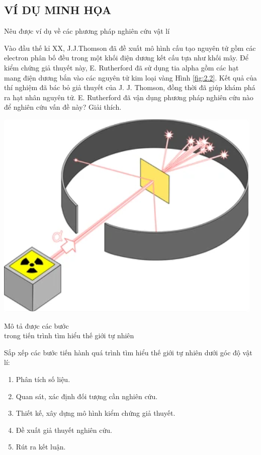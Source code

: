 \subsection{VÍ DỤ MINH HỌA}
\begin{dang}{Nêu được ví dụ về các phương pháp nghiên cứu vật lí}
\end{dang}
\begin{vd}
	Vào đầu thế kỉ XX, J.J.Thomson đã đề xuất mô hình cấu tạo nguyên tử gồm các electron phân bố đều trong một khối điện dương kết cấu tựa như khối mây. Để kiểm chứng giả thuyết này, E. Rutherford đã sử dụng tia alpha gồm các hạt mang điện dương bắn vào các nguyên tử kim loại vàng Hình \ref{fig:2.2}. Kết quả của thí nghiệm đã bác bỏ giả thuyết của J. J. Thomson, đồng thời đã giúp khám phá ra hạt nhân nguyên tử. E. Rutherford đã vận dụng phương pháp nghiên cứu nào để nghiên cứu vấn đề này? Giải thích.
	\begin{center}
		\includegraphics[scale=0.3]{figs/G10Y25B1-4}
		\label{fig:2.2}
	\end{center}
\end{vd}
\begin{dang}{Mô tả được các bước \\trong tiến trình tìm hiểu thế giới tự nhiên}
\end{dang}
\begin{vd}
	Sắp xếp các bước tiến hành quá trình tìm hiểu thế giới tự nhiên dưới góc độ vật lí:
	\begin{enumerate}[label= (\arabic*)]
		\item Phân tích số liệu.
		\item Quan sát, xác định đối tượng cần nghiên cứu.
		\item Thiết kế, xây dựng mô hình kiểm chứng giả thuyết.
		\item Đề xuất giả thuyết nghiên cứu.
		\item Rút ra kết luận.
	\end{enumerate}
\end{vd}
